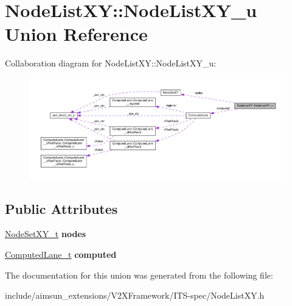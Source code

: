 \hypertarget{unionNodeListXY_1_1NodeListXY__u}{}\section{Node\+List\+XY\+:\+:Node\+List\+X\+Y\+\_\+u Union Reference}
\label{unionNodeListXY_1_1NodeListXY__u}


Collaboration diagram for Node\+List\+XY\+:\+:Node\+List\+X\+Y\+\_\+u\+:\nopagebreak
\begin{figure}[H]
\begin{center}
\leavevmode
\includegraphics[width=350pt]{unionNodeListXY_1_1NodeListXY__u__coll__graph}
\end{center}
\end{figure}
\subsection*{Public Attributes}
\begin{DoxyCompactItemize}
\item 
\hyperlink{structNodeSetXY}{Node\+Set\+X\+Y\+\_\+t} {\bfseries nodes}\hypertarget{unionNodeListXY_1_1NodeListXY__u_a6f20346637081b3e1526ca8f384a93db}{}\label{unionNodeListXY_1_1NodeListXY__u_a6f20346637081b3e1526ca8f384a93db}

\item 
\hyperlink{structComputedLane}{Computed\+Lane\+\_\+t} {\bfseries computed}\hypertarget{unionNodeListXY_1_1NodeListXY__u_a9d747f49983251f029c166cd10db173f}{}\label{unionNodeListXY_1_1NodeListXY__u_a9d747f49983251f029c166cd10db173f}

\end{DoxyCompactItemize}


The documentation for this union was generated from the following file\+:\begin{DoxyCompactItemize}
\item 
include/aimsun\+\_\+extensions/\+V2\+X\+Framework/\+I\+T\+S-\/spec/Node\+List\+X\+Y.\+h\end{DoxyCompactItemize}
